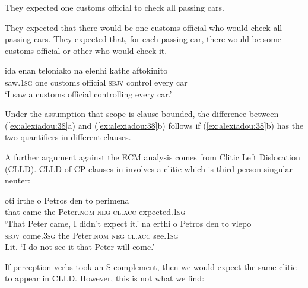 \documentclass[output=paper]{langsci/langscibook}
\begin{document}
\ea%
    \label{ex:alexiadou:38}
    \ea They expected one customs official to check all passing cars.\\
    \begin{xlisti}
    \ex They expected that there would be one customs official who would         check all passing cars.
    \ex They expected that, for each passing car, there would be some           customs official or other who would check it.  
    \end{xlisti}
    \ex 
    \gll ida          enan teloniako            na       elenhi   kathe  aftokinito\\
        saw{}.\textsc{1sg}   one   {customs official}  \textsc{sbjv} control  every  car\\
    \glt ‘I saw a customs official controlling every car.’
    \begin{xlisti}
    \end{xlisti}
    \z
\z

Under the assumption that  scope is clause-bounded, the difference between (\ref{ex:alexiadou:38}a) and (\ref{ex:alexiadou:38}b) follows if (\ref{ex:alexiadou:38}b) has the two quantifiers in different clauses. 

  A further argument against the ECM analysis comes from Clitic Left Dislocation (CLLD). CLLD of CP clauses in  involves a clitic which is third person singular neuter:

\ea%
    \label{ex:alexiadou:39}
    \ea
    \gll oti   irthe   o     Petros      den  to       perimena\\
          that  came the  Peter.\textsc{nom}  \textsc{neg}  \textsc{cl.acc} expected{}.\textsc{1sg}\\
    \glt ‘That Peter came, I didn't expect it.’
    \ex
    \gll na    erthi         o   Petros       den   to      vlepo\\
         \textsc{sbjv} come{}.\textsc{3sg} the Peter.\textsc{nom}  \textsc{neg}  \textsc{cl.acc} see{}.\textsc{1sg}\\
    \glt Lit. ‘I do not see it that Peter will come.’
    \z
\z    
 
If perception verbs took an S complement, then we would expect the same clitic to appear in CLLD. However, this is not what we find:
\end{document}
